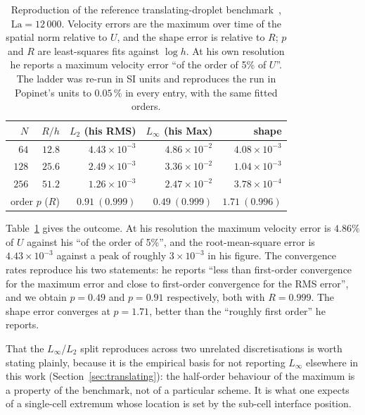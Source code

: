\documentclass[preprint,3p,11pt]{elsarticle}
\begin{document}
\begin{table}[t]
  \centering
  \caption{Reproduction of the reference translating-droplet benchmark~\cite{popinet2009},
  $\mathrm{La}=12\,000$. Velocity errors are the maximum over time of the spatial norm
  relative to $U$, and the shape error is relative to $R$; $p$ and $R$ are least-squares
  fits against $\log h$. At his own resolution he reports a maximum velocity error ``of the
  order of 5\% of $U$''. The ladder was re-run in SI units and reproduces the run in
  Popinet's units to $0.05\,\%$ in every entry, with the same fitted orders.}
  \label{tab:popinet}
  \begin{tabular}{r r r r r}
    \hline
    $N$ & $R/h$ & $L_2$ (his RMS) & $L_\infty$ (his Max) & shape \\
    \hline
    $64$ & $12.8$ & $4.43\times10^{-3}$ & $4.86\times10^{-2}$ & $4.08\times10^{-3}$ \\
    $128$ & $25.6$ & $2.49\times10^{-3}$ & $3.36\times10^{-2}$ & $1.04\times10^{-3}$ \\
    $256$ & $51.2$ & $1.26\times10^{-3}$ & $2.47\times10^{-2}$ & $3.78\times10^{-4}$ \\
    \hline
    \multicolumn{2}{l}{order $p$ ($R$)} & $0.91\ (0.999)$ & $0.49\ (0.999)$ & $1.71\ (0.996)$ \\
    \hline
  \end{tabular}
\end{table}

Table~\ref{tab:popinet} gives the outcome. At his resolution the maximum velocity error is
$4.86\%$ of $U$ against his ``of the order of 5\%'', and the root-mean-square error is
$4.43\times10^{-3}$ against a peak of roughly $3\times10^{-3}$ in his figure. The convergence
rates reproduce his two statements: he reports ``less than first-order convergence for the
maximum error and close to first-order convergence for the RMS error'', and we obtain
$p=0.49$ and $p=0.91$ respectively, both with $R=0.999$. The shape error converges at
$p=1.71$, better than the ``roughly first order'' he reports.

That the $L_\infty$/$L_2$ split reproduces across two unrelated discretisations is worth
stating plainly, because it is the empirical basis for not reporting $L_\infty$ elsewhere in
this work (Section~\ref{sec:translating}): the half-order behaviour of the maximum is a
property of the benchmark, not of a particular scheme. It is what one expects of a
single-cell extremum whose location is set by the sub-cell interface position.
\end{document}
